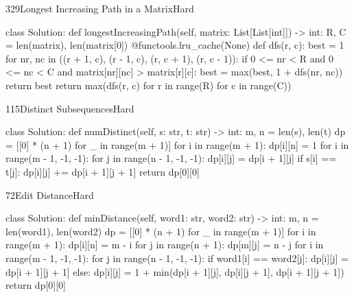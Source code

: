\begin{problem}{329}{Longest Increasing Path in a Matrix}{Hard}
\begin{code}
class Solution:
    def longestIncreasingPath(self, matrix: List[List[int]]) -> int:
        R, C = len(matrix), len(matrix[0])
        @functools.lru_cache(None)
        def dfs(r, c):
            best = 1
            for nr, nc in ((r + 1, c), (r - 1, c), (r, c + 1), (r, c - 1)):
                if 0 <= nr < R and 0 <= nc < C and matrix[nr][nc] > matrix[r][c]:
                    best = max(best, 1 + dfs(nr, nc))
            return best
        return max(dfs(r, c) for r in range(R) for c in range(C))
\end{code}
\end{problem}

\begin{problem}{115}{Distinct Subsequences}{Hard}
\begin{code}
class Solution:
    def numDistinct(self, s: str, t: str) -> int:
        m, n = len(s), len(t)
        dp = [[0] * (n + 1) for _ in range(m + 1)]
        for i in range(m + 1):
            dp[i][n] = 1
        for i in range(m - 1, -1, -1):
            for j in range(n - 1, -1, -1):
                dp[i][j] = dp[i + 1][j]
                if s[i] == t[j]:
                    dp[i][j] += dp[i + 1][j + 1]
        return dp[0][0]
\end{code}
\end{problem}

\begin{problem}{72}{Edit Distance}{Hard}
\begin{code}
class Solution:
    def minDistance(self, word1: str, word2: str) -> int:
        m, n = len(word1), len(word2)
        dp = [[0] * (n + 1) for _ in range(m + 1)]
        for i in range(m + 1): dp[i][n] = m - i
        for j in range(n + 1): dp[m][j] = n - j
        for i in range(m - 1, -1, -1):
            for j in range(n - 1, -1, -1):
                if word1[i] == word2[j]:
                    dp[i][j] = dp[i + 1][j + 1]
                else:
                    dp[i][j] = 1 + min(dp[i + 1][j], dp[i][j + 1], dp[i + 1][j + 1])
        return dp[0][0]
\end{code}
\end{problem}


